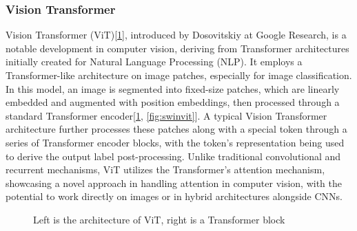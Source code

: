 \documentclass[10pt,twocolumn,letterpaper]{article}
\begin{document}
\subsubsection{Vision Transformer}
Vision Transformer (ViT)[\ref{fig:vit}], introduced by Dosovitskiy \etal\cite{dosovitskiy2020image} at Google Research, is a notable development in computer vision, deriving from Transformer\cite{vaswani2017attention} architectures initially created for Natural Language Processing (NLP). It employs a Transformer-like architecture on image patches, especially for image classification. In this model, an image is segmented into fixed-size patches, which are linearly embedded and augmented with position embeddings, then processed through a standard Transformer encoder\cite{dosovitskiy2020image, vaswani2017attention}[\ref{fig:vit}, \ref{fig:swinvit}]. A typical Vision Transformer architecture further processes these patches along with a special token through a series of Transformer encoder blocks, with the token's representation being used to derive the output label post-processing. Unlike traditional convolutional and recurrent mechanisms, ViT utilizes the Transformer's attention mechanism, showcasing a novel approach in handling attention in computer vision, with the potential to work directly on images or in hybrid architectures alongside CNNs.
\begin{figure}[h]
	\centering
	\caption{Left is the architecture of ViT\cite{dosovitskiy2020image}, right is a Transformer block\cite{vaswani2017attention}}
	\label{fig:vit}
\end{figure}
\end{document}
